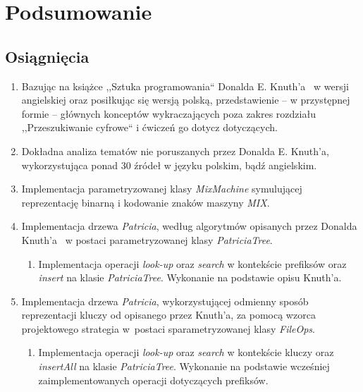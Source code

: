 \chapter{Podsumowanie}\label{cha:podsumowanie}
	
	\section{Osiągnięcia}\label{sec:PodsumowanieZaslugi}
	
	\begin{enumerate}
	    \item Bazując na książce ,,Sztuka programowania`` Donalda E. Knuth'a~\cite{KnuthsTheArtOfComputerProgramming3} w wersji angielskiej oraz posiłkując się wersją polską, przedstawienie -- w przystępnej formie -- głównych konceptów wykraczających poza zakres rozdziału ,,Przeszukiwanie cyfrowe`` i ćwiczeń go dotycz dotyczących.
	    
	    \item Dokładna analiza tematów nie poruszanych przez Donalda E. Knuth'a, wykorzystująca ponad 30 źródeł w języku polskim, bądź angielskim.
	    
	    \item Implementacja parametryzowanej klasy \emph{MixMachine} symulującej reprezentację binarną i kodowanie znaków maszyny \emph{MIX}.
	    
	    \item Implementacja drzewa \emph{Patricia}, według algorytmów opisanych przez Donalda Knuth'a~\cite{KnuthsTheArtOfComputerProgramming3} w postaci parametryzowanej klasy \emph{PatriciaTree}.
	    
	        \begin{enumerate}
	            \item Implementacja operacji \emph{look-up} oraz \emph{search} w kontekście prefiksów oraz \emph{insert} na klasie \emph{PatriciaTree}. Wykonanie na podstawie opisu Knuth'a.
	        \end{enumerate}
	    
	    \item Implementacja drzewa \emph{Patricia}, wykorzystującej odmienny sposób reprezentacji kluczy od opisanego przez Knuth'a, za pomocą wzorca projektowego strategia w~postaci sparametryzowanej klasy \emph{FileOps}.
	    
	        \begin{enumerate}
	            \item Implementacja operacji \emph{look-up} oraz \emph{search} w kontekście kluczy  oraz \emph{insertAll} na klasie \emph{PatriciaTree}. Wykonanie na podstawie wcześniej zaimplementowanych operacji dotyczących prefiksów.
	        \end{enumerate}
	    

\end{enumerate}
